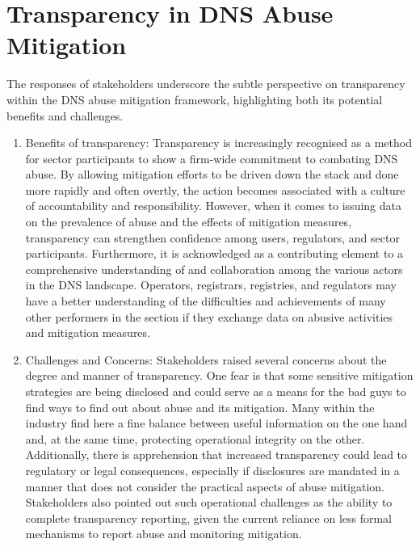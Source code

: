 \section{Transparency in DNS Abuse Mitigation} 

The responses of stakeholders underscore the subtle perspective on transparency within the DNS abuse mitigation framework, highlighting both its potential benefits and challenges.

\begin{enumerate}
    \item Benefits of transparency: Transparency is increasingly recognised as a method for sector participants to show a firm-wide commitment to combating DNS abuse. By allowing mitigation efforts to be driven down the stack and done more rapidly and often overtly, the action becomes associated with a culture of accountability and responsibility. However, when it comes to issuing data on the prevalence of abuse and the effects of mitigation measures, transparency can strengthen confidence among users, regulators, and sector participants. Furthermore, it is acknowledged as a contributing element to a comprehensive understanding of and collaboration among the various actors in the DNS landscape. Operators, registrars, registries, and regulators may have a better understanding of the difficulties and achievements of many other performers in the section if they exchange data on abusive activities and mitigation measures.

    \item Challenges and Concerns: Stakeholders raised several concerns about the degree and manner of transparency. One fear is that some sensitive mitigation strategies are being disclosed and could serve as a means for the bad guys to find ways to find out about abuse and its mitigation. Many within the industry find here a fine balance between useful information on the one hand and, at the same time, protecting operational integrity on the other. Additionally, there is apprehension that increased transparency could lead to regulatory or legal consequences, especially if disclosures are mandated in a manner that does not consider the practical aspects of abuse mitigation. Stakeholders also pointed out such operational challenges as the ability to complete transparency reporting, given the current reliance on less formal mechanisms to report abuse and monitoring mitigation.
    

\end{enumerate}

